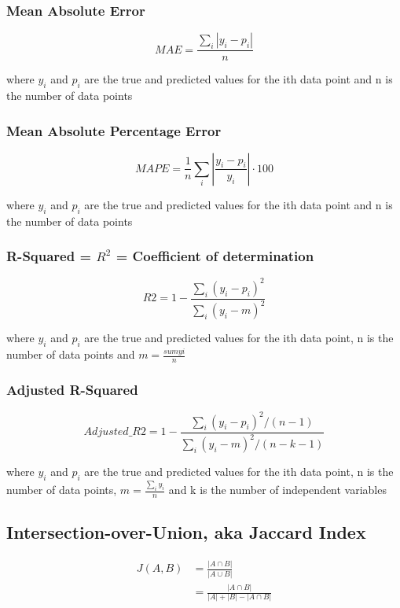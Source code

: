 \documentclass[a4paper,11pt]{article}
\begin{document}
\subsubsection{Mean Absolute Error}\label{formula:mae}

\begin{equation}
    MAE = \frac{\sum_i \left|y_i - p_i\right|}{n}
\end{equation}

where $y_i$ and $p_i$ are the true and predicted values for the ith data point and n is the number of data points

\subsubsection{Mean Absolute Percentage Error}\label{formula:mape}

\begin{equation}
    MAPE = \frac{1}{n}\sum_i \left|\frac{y_i - p_i}{y_i}\right| \cdot 100
\end{equation}

where $y_i$ and $p_i$ are the true and predicted values for the ith data point and n is the number of data points

\subsubsection{R-Squared = $R^2$ = Coefficient of determination}\label{formula:r2}

\begin{equation}
    R2 = 1 - \frac{\sum_i (y_i - p_i)^2}{\sum_i (y_i - m)^2}
\end{equation}

where $y_i$ and $p_i$ are the true and predicted values for the ith data point, n is the number of data points and $m = \frac{sum yi}{n}$

\subsubsection{Adjusted R-Squared}\label{formula:rss}

\begin{equation}
    Adjusted\_R2 = 1 - \frac{\sum_i (y_i - p_i)^2 / (n - 1)}{\sum_i (y_i - m)^2 / (n - k - 1)}
\end{equation}

where $y_i$ and $p_i$ are the true and predicted values for the ith data point, n is the number of data points, $m = \frac{\sum_i y_i}{n}$ and k is the number of independent variables

\subsection{Intersection-over-Union, aka Jaccard Index}\label{formula:iou}

\begin{align}
    J(A,B) &= \frac{\left|A \cap B\right|}{\left|A \cup B\right|}\\
    &= \frac{\left|A \cap B\right|}{\left|A\right| + \left|B\right| - \left|A \cap B\right|}
\end{align}


\clearpage



\end{document}
